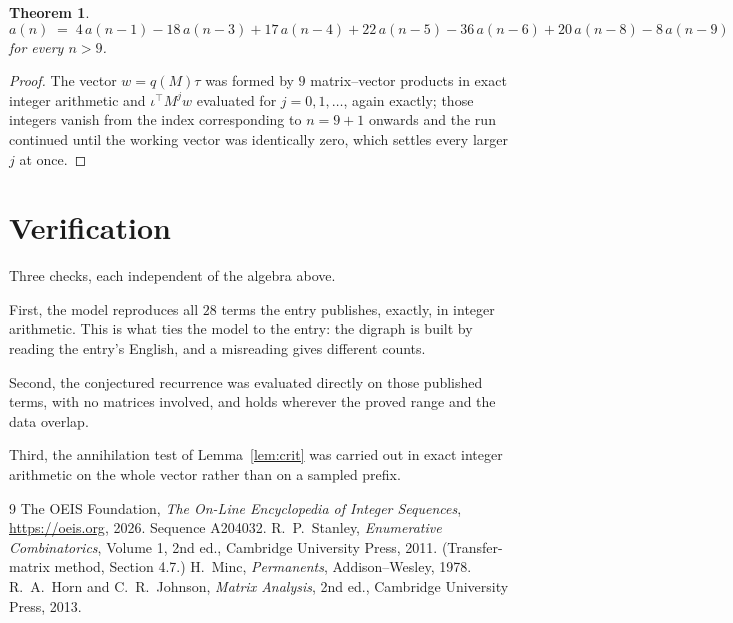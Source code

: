 \documentclass[11pt,a4paper]{article}
\theoremstyle{plain}
\newtheorem{theorem}{Theorem}
\theoremstyle{definition}
\begin{document}
\begin{theorem}
\[
a(n)\;=\;4\,a(n-1) - 18\,a(n-3) + 17\,a(n-4) + 22\,a(n-5) - 36\,a(n-6) + 20\,a(n-8) - 8\,a(n-9)
\]
for every $n>9$.
\end{theorem}

\begin{proof}
The vector $w=q(M)\tau$ was formed by $9$ matrix--vector products in exact integer
arithmetic and $\iota^{\!\top}M^{j}w$ evaluated for $j=0,1,\dots$, again exactly; those
integers vanish from the index corresponding to $n=9+1$ onwards and the run continued
until the working vector was identically zero, which settles every larger $j$ at once.
\end{proof}

\section{Verification}

Three checks, each independent of the algebra above.

First, the model reproduces all $28$ terms the entry publishes, exactly, in integer
arithmetic. This is what ties the model to the entry: the digraph is built by reading the
entry's English, and a misreading gives different counts.

Second, the conjectured recurrence was evaluated directly on those published terms, with no
matrices involved, and holds wherever the proved range and the data overlap.

Third, the annihilation test of Lemma~\ref{lem:crit} was carried out in exact integer
arithmetic on the whole vector rather than on a sampled prefix.

\begin{thebibliography}{9}
 The OEIS Foundation, \emph{The On-Line Encyclopedia of Integer
Sequences}, \url{https://oeis.org}, 2026. Sequence A204032.
 R.~P.~Stanley, \emph{Enumerative Combinatorics}, Volume 1, 2nd ed.,
Cambridge University Press, 2011. (Transfer-matrix method, Section 4.7.)
 H.~Minc, \emph{Permanents}, Addison--Wesley, 1978.
 R.~A.~Horn and C.~R.~Johnson, \emph{Matrix Analysis}, 2nd ed., Cambridge
University Press, 2013.
\end{thebibliography}
\end{document}
